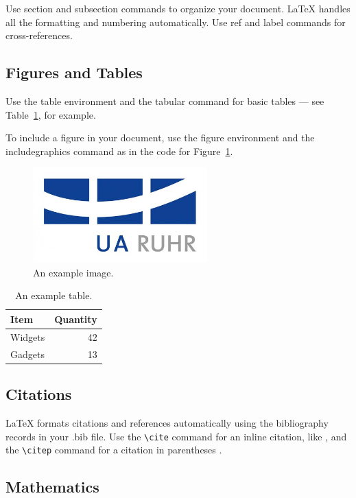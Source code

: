 \documentclass[fleqn,10pt,twoside]{gcb15submission}
\begin{document}
Use section and subsection commands to organize your document. \LaTeX{} handles all the formatting and numbering automatically. Use ref and label commands for cross-references.

\subsection*{Figures and Tables}

Use the table environment and the tabular command for basic tables --- see Table~\ref{tab:widgets}, for example.

To include a figure in your document, use the figure environment and the includegraphics command as in the code for Figure~\ref{fig:uaruhr}.

\begin{figure}[ht]\centering
\includegraphics[width=0.6\textwidth]{uaruhr}
\caption{An example image.}
\label{fig:uaruhr}
\end{figure}

\begin{table}[ht]
\centering
\begin{tabular}{l|r}
Item & Quantity \\\hline
Widgets & 42 \\
Gadgets & 13
\end{tabular}
\caption{\label{tab:widgets}An example table.}
\end{table}

\subsection*{Citations}

LaTeX formats citations and references automatically using the bibliography records in your .bib file.
Use the \verb|\cite| command for an inline citation, like \cite{MuellerRahmann+2003RobustEstimation}, and the \verb|\citep| command for a citation in parentheses \citep{MuellerRahmann+2003RobustEstimation}.

\subsection*{Mathematics}
\end{document}
